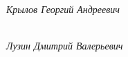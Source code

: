 	\begin{minipage}[h]{0.47\linewidth}
		\\
		\emph{Крылов Георгий Андреевич}
	\end{minipage}
	\center  
	\center  
	\vfill 
	\begin{minipage}[h]{0.47\linewidth}
		\\
		\emph{Лузин Дмитрий Валерьевич}
	\end{minipage}
